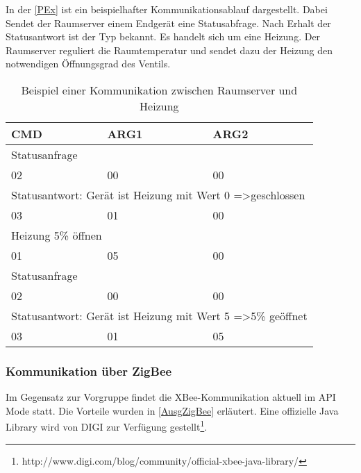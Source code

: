 In der \autoref{PEx} ist ein beispielhafter Kommunikationsablauf dargestellt. Dabei Sendet der Raumserver einem Endgerät eine Statusabfrage. Nach Erhalt der Statusantwort ist der Typ bekannt. Es handelt sich um eine Heizung. Der Raumserver reguliert die Raumtemperatur und sendet dazu der Heizung den notwendigen Öffnungsgrad des Ventils. 

\begin{table}[]
\centering
\begin{tabular}{|l|l|l|}
\hline
\textbf{CMD}                  & \textbf{ARG1}                 & \textbf{ARG2}                \\ \hline
\multicolumn{3}{|l|}{Statusanfrage}                                                          \\ \hline
02                            & 00                            & 00                           \\ \hline
\multicolumn{3}{|l|}{Statusantwort: Gerät ist Heizung mit Wert 0 =\textgreater geschlossen}  \\ \hline
03                            & 01                            & 00                           \\ \hline
\multicolumn{3}{|l|}{Heizung 5\% öffnen}                                                     \\ \hline
01                            & 05                            & 00                           \\ \hline
\multicolumn{3}{|l|}{Statusanfrage}                                                          \\ \hline
02                            & 00                            & 00                           \\ \hline
\multicolumn{3}{|l|}{Statusantwort: Gerät ist Heizung mit Wert 5 =\textgreater 5\% geöffnet} \\ \hline
03                            & 01                            & 05                           \\ \hline
\end{tabular}
\caption{Beispiel einer Kommunikation zwischen Raumserver und Heizung}
\label{PEx}
\end{table}

\subsubsection{Kommunikation über ZigBee}\label{ZigBee}
Im Gegensatz zur Vorgruppe findet die XBee-Kommunikation aktuell im \ac{API Mode} statt. Die Vorteile wurden in \autoref{AusgZigBee} erläutert. Eine offizielle Java Library wird von DIGI zur Verfügung gestellt\footnote{http://www.digi.com/blog/community/official-xbee-java-library/}.

